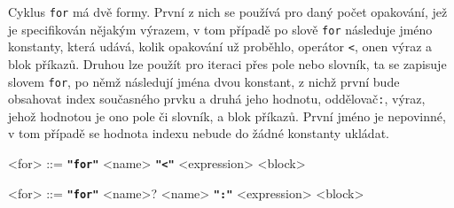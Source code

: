 \documentclass[a4paper,12pt]{article}
\def\quote #1{"#1"}
\def\emphasis #1{\textbf{\texttt{\quote{#1}}}}
\begin{document}
Cyklus \texttt{for} má dvě formy. První z nich se používá pro daný počet opakování, jež je specifikován nějakým výrazem, v tom případě po slově \texttt{for} následuje jméno konstanty, která udává, kolik opakování už proběhlo, operátor \texttt{\textless}, onen výraz a blok příkazů. Druhou lze použít pro iteraci přes pole nebo slovník, ta se zapisuje slovem \texttt{for}, po němž následují jména dvou konstant, z nichž první bude obsahovat index současného prvku a druhá jeho hodnotu, oddělovač\texttt{:}, výraz, jehož hodnotou je ono pole či slovník, a blok příkazů. První jméno je nepovinné, v tom případě se hodnota indexu nebude do žádné konstanty ukládat.
\begin{grammar}
<for> ::= \emphasis{for} <name> \emphasis{\textless} <expression> <block>

<for> ::= \emphasis{for} <name>? <name> \emphasis{:} <expression> <block>
\end{grammar}
\end{document}
